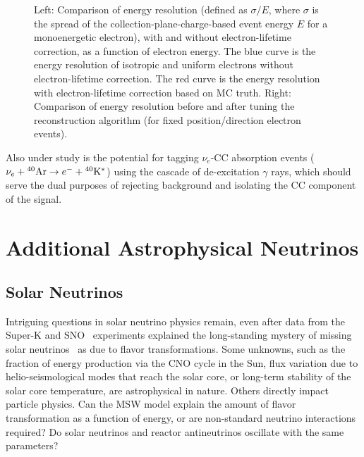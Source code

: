 %
\begin{figure}[!htb] %
 \centering
 \caption[Comparisons of energy resolution]{Left: Comparison of energy
   resolution (defined as $\sigma/E$, where $\sigma$ is the spread of
   the collection-plane-charge-based event energy $E$ for a
   monoenergetic electron), with and without electron-lifetime
   correction, as a function of electron energy. The blue curve is the
   energy resolution of isotropic and uniform electrons without
   electron-lifetime correction. The red curve is the energy
   resolution with electron-lifetime correction based on MC truth.
   Right: Comparison of energy resolution before and after tuning the
   reconstruction algorithm (for fixed position/direction electron
   events).}\label{fig:lowe_res}
\end{figure}


Also under study is the potential for tagging $\nu_e$-CC absorption
events ($\nu_e +{}^{40}{\rm Ar} \rightarrow e^- +{}^{40}{\rm
  K^*}$) using the cascade of de-excitation $\gamma$ rays, which should
serve the dual purposes of rejecting background and isolating the CC
component of the signal.  





\section{Additional Astrophysical Neutrinos}
\label{sec:physics-snblowe-other}

\subsection{Solar Neutrinos}

Intriguing questions in solar neutrino physics remain,
even after data
from the Super-K and SNO~\cite{Fukuda:2001nj,Ahmad:2001an}
experiments explained the long-standing mystery of missing solar
neutrinos~\cite{Cleveland:1998nv} as due to flavor
transformations. 
Some unknowns, such as the fraction of energy production via the CNO
cycle in the Sun, flux variation due to helio-seismological modes that
reach the solar core, or long-term stability of the solar core
temperature, are astrophysical in nature. Others directly impact
particle physics. Can the MSW model explain the amount of flavor
transformation as a function of energy, or are non-standard neutrino
interactions required?  Do solar neutrinos and reactor antineutrinos
oscillate with the same parameters? 

